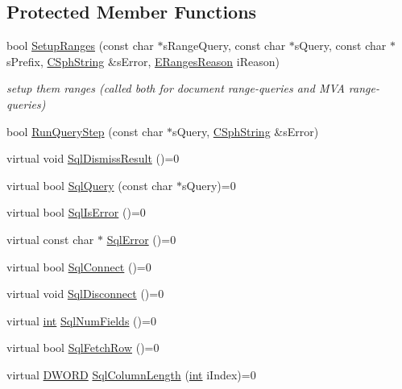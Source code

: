 \subsection*{Protected Member Functions}
\begin{DoxyCompactItemize}
\item 
bool \hyperlink{structCSphSource__SQL_a1ac9ba01e6f2ac183c6362bf80b8ae51}{Setup\-Ranges} (const char $\ast$s\-Range\-Query, const char $\ast$s\-Query, const char $\ast$s\-Prefix, \hyperlink{structCSphString}{C\-Sph\-String} \&s\-Error, \hyperlink{structCSphSource__SQL_adb285a8a9637c5528a46366089fdaccf}{E\-Ranges\-Reason} i\-Reason)
\begin{DoxyCompactList}\small\item\em setup them ranges (called both for document range-\/queries and M\-V\-A range-\/queries) \end{DoxyCompactList}\item 
bool \hyperlink{structCSphSource__SQL_a4acbfd270a0dd4ac01e209fd05790e9c}{Run\-Query\-Step} (const char $\ast$s\-Query, \hyperlink{structCSphString}{C\-Sph\-String} \&s\-Error)
\item 
virtual void \hyperlink{structCSphSource__SQL_a92b1c42170c994dc119845a36c6bd353}{Sql\-Dismiss\-Result} ()=0
\item 
virtual bool \hyperlink{structCSphSource__SQL_a391ddc43bfef201721bea7be396da8bc}{Sql\-Query} (const char $\ast$s\-Query)=0
\item 
virtual bool \hyperlink{structCSphSource__SQL_a4917bc69c39dd20f81272e1706369aca}{Sql\-Is\-Error} ()=0
\item 
virtual const char $\ast$ \hyperlink{structCSphSource__SQL_a2db14a17dac262d1012a471cc78d655c}{Sql\-Error} ()=0
\item 
virtual bool \hyperlink{structCSphSource__SQL_af4bced57ef46a44e380ea44c85d43951}{Sql\-Connect} ()=0
\item 
virtual void \hyperlink{structCSphSource__SQL_afca96f63f3fb9dcf38769ec42d3f01d2}{Sql\-Disconnect} ()=0
\item 
virtual \hyperlink{sphinxexpr_8cpp_a4a26e8f9cb8b736e0c4cbf4d16de985e}{int} \hyperlink{structCSphSource__SQL_ac4612ee310ab8c6f26e4a6cf21e26d34}{Sql\-Num\-Fields} ()=0
\item 
virtual bool \hyperlink{structCSphSource__SQL_a264f8e887c87298f671ddc26513625b7}{Sql\-Fetch\-Row} ()=0
\item 
virtual \hyperlink{sphinxstd_8h_a798af1e30bc65f319c1a246cecf59e39}{D\-W\-O\-R\-D} \hyperlink{structCSphSource__SQL_a421fea4866eaec977a77fb71bc4bb52d}{Sql\-Column\-Length} (\hyperlink{sphinxexpr_8cpp_a4a26e8f9cb8b736e0c4cbf4d16de985e}{int} i\-Index)=0

\end{DoxyCompactItemize}
